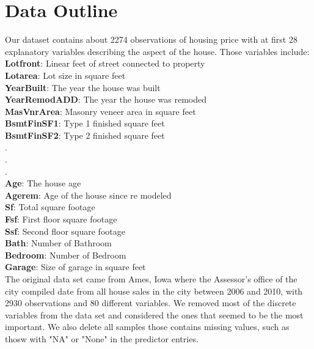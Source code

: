 \documentclass{article}
\begin{document}
\section*{Data Outline}
Our dataset contains about 2274 observations of housing price with at first 28 explanatory variables describing the aspect of the house. Those variables include:\\
\textbf{Lotfront}: Linear feet of street connected to property\\
\textbf{Lotarea}: Lot size in square feet\\
\textbf{YearBuilt}: The year the house was built\\
\textbf{YearRemodADD}: The year the house was remoded\\
\textbf{MasVnrArea}: Masonry veneer area in square feet\\
\textbf{BsmtFinSF1}: Type 1 finished square feet\\
\textbf{BsmtFinSF2}: Type 2 finished square feet\\
.\\
.\\
.\\
\textbf{Age}: The house age\\
\textbf{Agerem}:  Age of the house since re modeled\\
\textbf{Sf}: Total square footage\\
\textbf{Fsf}: First floor square footage\\
\textbf{Ssf}: Second floor square footage\\
\textbf{Bath}: Number of Bathroom\\
\textbf{Bedroom}: Number of Bedroom\\
\textbf{Garage}: Size of garage in square feet\\
The original data set came from Ames, Iowa where the Assessor’s office of the city compiled date from all house sales in the city between 2006 and 2010, with 2930 observations and 80 different variables. We removed most of the discrete variables from the data set and considered the ones that seemed to be the most important. We also delete all samples those contains missing values, such as thosw with "NA" or "None" in the predictor entries. 
\end{document}

